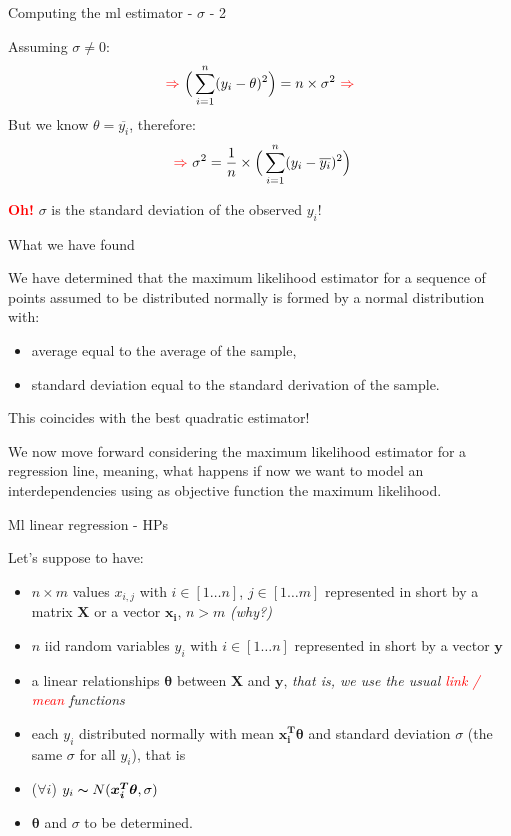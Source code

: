 \documentclass{beamer}
\begin{document}
\begin{frame}
{\centerline{Computing the ml estimator - $\sigma$ - 2}}

Assuming $\sigma \ne 0$: 
$$ 
~\textcolor{red}{\Rightarrow}~
 \Big(\sum_{i=1}^n  ({y_i - \theta})^2 \Big) = n \times \sigma^2 
 ~\textcolor{red}{\Rightarrow}~
$$
But we know $\theta = \overline{y_i}$, therefore:
$$
~\textcolor{red}{\Rightarrow}~
 \sigma^2 = {\frac 1 n} \times \Big(\sum_{i=1}^n  ({y_i - \overline{y_i}})^2 \Big) 
 $$
 
\textcolor{red}{\bf Oh!} $\sigma$ is the standard deviation of the observed $y_i$!

\end{frame}

\begin{frame}
{\centerline{What we have found}}

We have determined that the maximum likelihood estimator for a sequence of points assumed to be distributed normally is formed by a normal distribution with:
\begin{itemize}
\item average equal to the average of the sample,
\item standard deviation equal to the standard derivation of the sample.
\end{itemize}

This coincides with the best quadratic estimator!
\vspace{1cm}

We now move forward considering the maximum likelihood estimator for a regression line, meaning, what happens if now we want to model an interdependencies using as objective function the maximum likelihood.

\end{frame}

\begin{frame}
{\centerline{Ml linear regression - HPs}}

Let's suppose to have:
\begin{itemize}
\item $n \times m$ values $x_{i,j}$ with $ i \in [1 \ldots n]$, $ j \in [1 \ldots m]$ represented in short by a matrix $\boldsymbol{X}$ or a vector $\mathbf{x_i}$, $n>m$ \textit{(why?)}
\item $n$ iid random variables $y_i$ with $ i \in [1 \ldots n]$ represented in short by a vector $\boldsymbol{y}$
\item a linear relationships $\boldsymbol{\theta}$ between $\boldsymbol{X}$  and $\boldsymbol{y}$, \textit{that is, we use the usual \textcolor{red}{link / mean} functions}
\item each $y_i$ distributed normally with mean $\boldsymbol{x_i^T \theta}$ and standard deviation $\sigma$ (the same $\sigma$ for all $y_i$), that is 
\item ($\forall i$) $y_i \thicksim N(\boldsymbol{x_i^T \theta},\sigma)$
\item $\boldsymbol{\theta}$ and $\sigma$ to be determined.
\end{itemize}
\end{frame}
\end{document}
